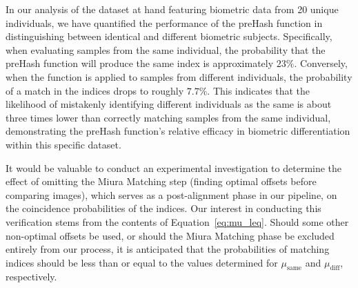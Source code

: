 In our analysis of the dataset at hand featuring biometric data from 20 unique individuals, we have quantified the performance of the preHash function in distinguishing between identical and different biometric subjects. Specifically, when evaluating samples from the same individual, the probability that the preHash function will produce the same index is approximately \(23\%\). Conversely, when the function is applied to samples from different individuals, the probability of a match in the indices drops to roughly \(7.7\%\). This indicates that the likelihood of mistakenly identifying different individuals as the same is about three times lower than correctly matching samples from the same individual, demonstrating the preHash function's relative efficacy in biometric differentiation within this specific dataset.

It would be valuable to conduct an experimental investigation to determine the effect of omitting the Miura Matching step (finding optimal offsets before comparing images), which serves as a post-alignment phase in our pipeline, on the coincidence probabilities of the indices. Our interest in conducting this verification stems from the contents of Equation~\ref{eq:mu_leq}. Should some other non-optimal offsets be used, or should the Miura Matching phase be excluded entirely from our process, it is anticipated that the probabilities of matching indices should be less than or equal to the values determined for \(\mu_{\text{same}}\) and \(\mu_{\text{diff}}\), respectively.






